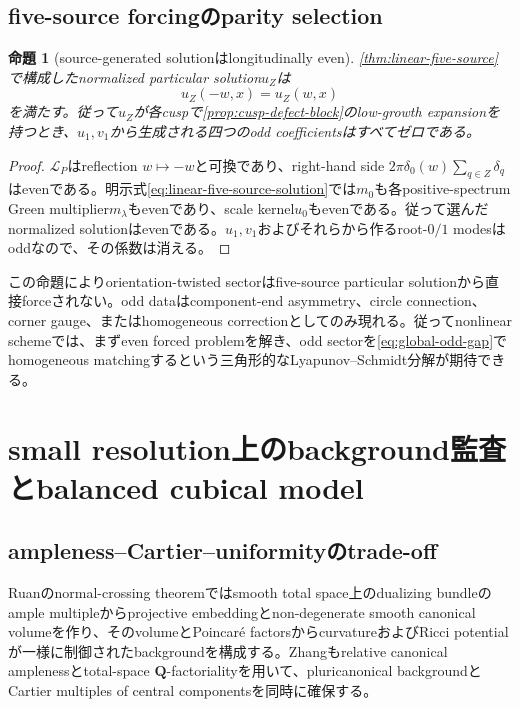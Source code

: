 \documentclass[11pt,a4paper]{ltjsarticle}
\newtheorem{proposition}[theorem]{命題}
\theoremstyle{definition}
\theoremstyle{remark}
\begin{document}
\subsection{five-source forcingのparity selection}

\begin{proposition}[source-generated solutionはlongitudinally even]\label{prop:source-even-parity}
\cref{thm:linear-five-source}で構成したnormalized particular solution$u_Z$は
\begin{equation}\label{eq:source-even-parity}
 u_Z(-w,x)=u_Z(w,x)
\end{equation}
を満たす。従って$u_Z$が各cuspで\cref{prop:cusp-defect-block}のlow-growth expansionを持つとき、$u_1,v_1$から生成される四つのodd coefficientsはすべてゼロである。
\end{proposition}

\begin{proof}
$\mathscr L_P$はreflection $w\mapsto-w$と可換であり、right-hand side
$2\pi\delta_0(w)\sum_{q\in Z}\delta_q$はevenである。明示式\eqref{eq:linear-five-source-solution}では$m_0$も各positive-spectrum Green multiplier$m_\lambda$もevenであり、scale kernel$u_0$もevenである。従って選んだnormalized solutionはevenである。$u_1,v_1$およびそれらから作るroot-$0/1$ modesはoddなので、その係数は消える。
\end{proof}

この命題によりorientation-twisted sectorはfive-source particular solutionから直接forceされない。odd dataはcomponent-end asymmetry、circle connection、corner gauge、またはhomogeneous correctionとしてのみ現れる。従ってnonlinear schemeでは、まずeven forced problemを解き、odd sectorを\cref{eq:global-odd-gap}でhomogeneous matchingするという三角形的なLyapunov--Schmidt分解が期待できる。

\section{small resolution上のbackground監査とbalanced cubical model}
\label{sec:poincare-cubical}

\subsection{ampleness--Cartier--uniformityのtrade-off}

Ruanのnormal-crossing theoremではsmooth total space上のdualizing bundleのample multipleからprojective embeddingとnon-degenerate smooth canonical volumeを作り、そのvolumeとPoincaré factorsからcurvatureおよびRicci potentialが一様に制御されたbackgroundを構成する\cite{RuanI}。Zhangもrelative canonical amplenessとtotal-space $\mathbf Q$-factorialityを用いて、pluricanonical backgroundとCartier multiples of central componentsを同時に確保する\cite{Zhang}。
\end{document}
